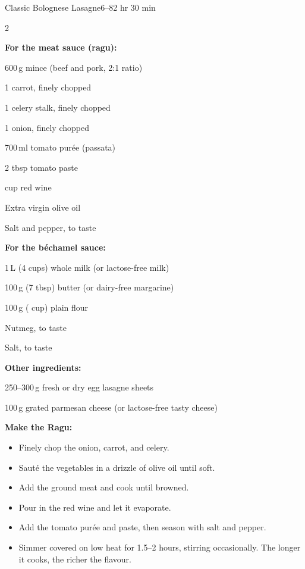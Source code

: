 \begin{recipebox}{Classic Bolognese Lasagne}{6--8}{2 hr 30 min}

  \begin{ingredients}
    \begin{multicols}{2}
      \item \textbf{For the meat sauce (ragu):}
      \item 600\,g mince (beef and pork, 2:1 ratio)
      \item 1 carrot, finely chopped
      \item 1 celery stalk, finely chopped
      \item 1 onion, finely chopped
      \item 700\,ml tomato purée (passata)
      \item 2 tbsp tomato paste
      \item {} cup red wine
      \item Extra virgin olive oil
      \item Salt and pepper, to taste
      \columnbreak
      \item \textbf{For the béchamel sauce:}
      \item 1\,L (4 cups) whole milk (or lactose-free milk)
      \item 100\,g (7 tbsp) butter (or dairy-free margarine)
      \item 100\,g ( cup) plain flour
      \item Nutmeg, to taste
      \item Salt, to taste
      \vspace{0.4em}
      \item \textbf{Other ingredients:}
      \item 250--300\,g fresh or dry egg lasagne sheets
      \item 100\,g grated parmesan cheese (or lactose-free tasty cheese)
    \end{multicols}
  \end{ingredients}

  \vspace{-1em}
  \begin{method}
    \item \textbf{Make the Ragu:}
    \begin{itemize}[leftmargin=2em]
      \item Finely chop the onion, carrot, and celery.
      \item Sauté the vegetables in a drizzle of olive oil until soft.
      \item Add the ground meat and cook until browned.
      \item Pour in the red wine and let it evaporate.
      \item Add the tomato purée and paste, then season with salt and pepper.
      \item Simmer covered on low heat for 1.5--2 hours, stirring occasionally. The longer it cooks, the richer the flavour.
    \end{itemize}


\end{method}
\end{recipebox}
